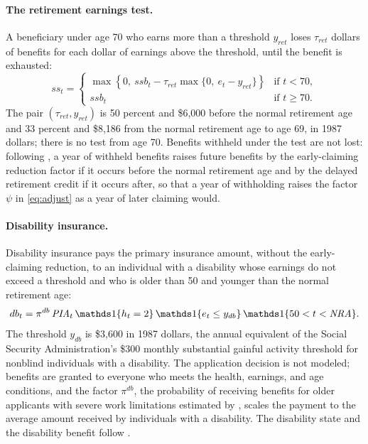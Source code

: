 \paragraph{The retirement earnings test.}
A beneficiary under age 70 who earns more than a threshold $y_{ret}$ loses $\tau_{ret}$ dollars of benefits for each dollar of earnings above the threshold, until the benefit is exhausted: %
\begin{equation}\label{eq:ret}
ss_t=
\begin{cases}
\max\left\{0,\ ssb_t-\tau_{ret}\max\{0,\ e_t-y_{ret}\}\right\} & \text{if } t<70,\\
ssb_t & \text{if } t\geq 70.
\end{cases}
\end{equation}
The pair $(\tau_{ret},y_{ret})$ is 50 percent and \$6,000 before the normal retirement age and 33 percent and \$8,186 from the normal retirement age to age 69, in 1987 dollars; there is no test from age 70. %
Benefits withheld under the test are not lost: following \citet{french2011effects}, a year of withheld benefits raises future benefits by the early-claiming reduction factor if it occurs before the normal retirement age and by the delayed retirement credit if it occurs after, so that a year of withholding raises the factor $\psi$ in \eqref{eq:adjust} as a year of later claiming would. %

\paragraph{Disability insurance.}
Disability insurance pays the primary insurance amount, without the early-claiming reduction, to an individual with a disability whose earnings do not exceed a threshold and who is older than 50 and younger than the normal retirement age:
\begin{equation}\label{eq:di}
db_t=\pi^{db}\,\PIA_t\,\ind{h_t=2}\,\ind{e_t\leq y_{db}}\,\ind{50<t<\NRA}.
\end{equation}
The threshold $y_{db}$ is \$3,600 in 1987 dollars, the annual equivalent of the Social Security Administration's \$300 monthly substantial gainful activity threshold for nonblind individuals with a disability. %
The application decision is not modeled; benefits are granted to everyone who meets the health, earnings, and age conditions, and the factor $\pi^{db}$, the probability of receiving benefits for older applicants with severe work limitations estimated by \citet{Low2015}, scales the payment to the average amount received by individuals with a disability. %
The disability state and the disability benefit follow \citet{Yu2024}.

